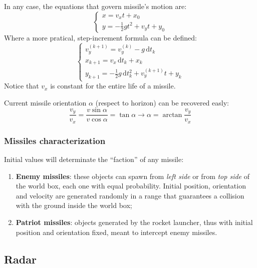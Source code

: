 \documentclass[notitlepage,a4paper,11pt]{article} %
\newcommand{\ud}{\,\mathrm{d}} %
\begin{document}
		In any case, the equations that govern missile's motion are:
		\begin{equation}
			\begin{cases}
				x = v_x t + x_0 \\
				y = - \frac{1}{2} g t^2 + v_y t + y_0
			\end{cases}
		\end{equation}
		Where a more pratical, step-increment formula can be defined:
		\begin{equation}
			\begin{cases}
				v_y^{(k+1)} = v_y^{(k)} - g \ud t_k \\
				x_{k+1} = v_x \ud t_k + x_k \\
				y_{k+1} = - \frac{1}{2} g \ud t_k^2 + v_y^{(k+1)} t + y_k
			\end{cases}
		\end{equation}
		Notice that $v_x$ is constant for the entire life of a missile.

		Current missile orientation $\alpha$ (respect to horizon) can be recovered easly:
		\begin{equation}
			\frac{v_y}{v_x} = \frac{v \sin{\alpha}}{v \cos{\alpha}} = \tan{\alpha}
			\to \alpha = \arctan{\frac{v_y}{v_x}}
		\end{equation}

		\subsubsection{Missiles characterization}

			Initial values will determinate the ``faction'' of any missile:

			\begin{enumerate}

				\item \textbf{Enemy missiles}: these objects can spawn from \emph{left side} or from \emph{top side} of the world box, each one with equal probability. Initial position, orientation and velocity are generated randomly in a range that guarantees a collision with the ground inside the world box;
				\item \textbf{Patriot missiles}: objects generated by the rocket launcher, thus with initial position and orientation fixed, meant to intercept enemy missiles.
			\end{enumerate}

	\subsection{Radar}
\end{document}
